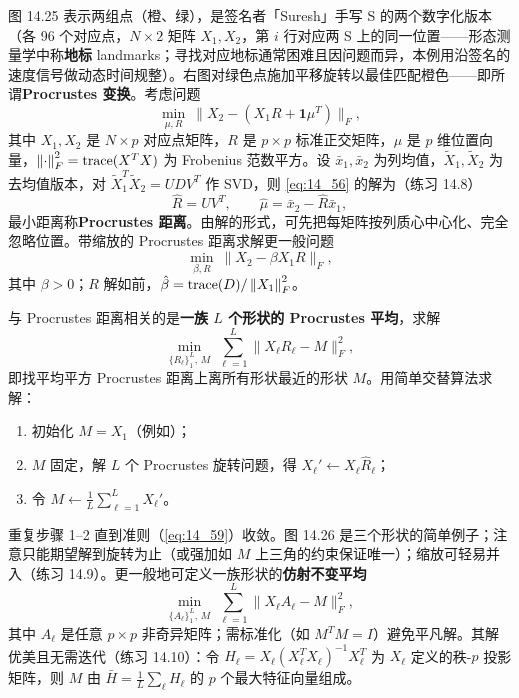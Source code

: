 \begin{example}
图 14.25 表示两组点（橙、绿），是签名者「Suresh」手写 S 的两个数字化版本（各 96 个对应点，$N\times 2$ 矩阵 $X_1,X_2$，第 $i$ 行对应两 S 上的同一位置——形态测量学中称\textbf{地标} landmarks；寻找对应地标通常困难且因问题而异，本例用沿签名的速度信号做动态时间规整）。右图对绿色点施加平移旋转以最佳匹配橙色——即所谓\textbf{Procrustes 变换}。考虑问题
\begin{equation}
\min_{\mu,R}\ \bigl\|X_2 - (X_1R + \mathbf{1}\mu^T)\bigr\|_F, \label{eq:14_56}
\end{equation}
其中 $X_1,X_2$ 是 $N\times p$ 对应点矩阵，$R$ 是 $p\times p$ 标准正交矩阵，$\mu$ 是 $p$ 维位置向量，$\left\lVert\cdot\right\rVert_F^2=\mathrm{trace}(X^TX)$ 为 Frobenius 范数平方。设 $\bar x_1,\bar x_2$ 为列均值，$\tilde X_1,\tilde X_2$ 为去均值版本，对 $\tilde X_1^T\tilde X_2=UDV^T$ 作 SVD，则 \eqref{eq:14_56} 的解为（练习 14.8）
\begin{equation}
\hat R = UV^T,\qquad \hat\mu = \bar x_2 - \hat R\bar x_1, \label{eq:14_57}
\end{equation}
最小距离称\textbf{Procrustes 距离}。由解的形式，可先把每矩阵按列质心中心化、完全忽略位置。带缩放的 Procrustes 距离求解更一般问题
\begin{equation}
\min_{\beta,R}\ \bigl\|X_2 - \beta X_1R\bigr\|_F, \label{eq:14_58}
\end{equation}
其中 $\beta>0$；$R$ 解如前，$\hat\beta=\mathrm{trace}(D)/\left\lVert X_1\right\rVert_F^2$。

与 Procrustes 距离相关的是\textbf{一族 $L$ 个形状的 Procrustes 平均}，求解
\begin{equation}
\min_{\{R_\ell\}_1^L,\,M}\ \sum_{\ell=1}^{L}\bigl\|X_\ell R_\ell - M\bigr\|_F^2, \label{eq:14_59}
\end{equation}
即找平均平方 Procrustes 距离上离所有形状最近的形状 $M$。用简单交替算法求解：
\begin{enumerate}[itemsep=1pt]
\item 初始化 $M=X_1$（例如）；
\item $M$ 固定，解 $L$ 个 Procrustes 旋转问题，得 $X_\ell'\leftarrow X_\ell\hat R_\ell$；
\item 令 $M\leftarrow \frac{1}{L}\sum_{\ell=1}^{L}X_\ell'$。
\end{enumerate}
重复步骤 1--2 直到准则（\eqref{eq:14_59}）收敛。图 14.26 是三个形状的简单例子；注意只能期望解到旋转为止（或强加如 $M$ 上三角的约束保证唯一）；缩放可轻易并入（练习 14.9）。更一般地可定义一族形状的\textbf{仿射不变平均}
\begin{equation}
\min_{\{A_\ell\}_1^L,\,M}\ \sum_{\ell=1}^{L}\bigl\|X_\ell A_\ell - M\bigr\|_F^2, \label{eq:14_60}
\end{equation}
其中 $A_\ell$ 是任意 $p\times p$ 非奇异矩阵；需标准化（如 $M^TM=I$）避免平凡解。其解优美且无需迭代（练习 14.10）：令 $H_\ell=X_\ell(X_\ell^TX_\ell)^{-1}X_\ell^T$ 为 $X_\ell$ 定义的秩-$p$ 投影矩阵，则 $M$ 由 $\bar H=\frac{1}{L}\sum_\ell H_\ell$ 的 $p$ 个最大特征向量组成。
\end{example}

